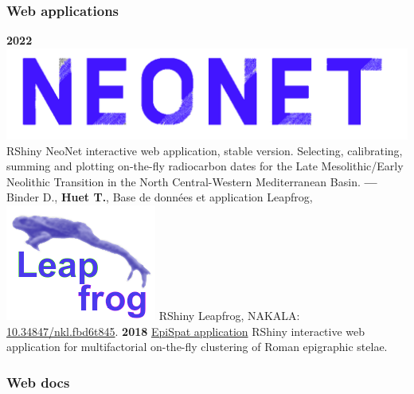 \documentclass{article}
\begin{document}
\subsubsection*{Web applications}

\smallbreak
\textbf{2022 }\href{http://shinyserver.cfs.unipi.it:3838/C14/}{\includegraphics[scale=0.04]{neonet-blue.png}} \textsf{RShiny} NeoNet interactive web application, stable version. Selecting, calibrating, summing and plotting on-the-fly radiocarbon dates for the Late Mesolithic/Early Neolithic Transition in the North Central-Western Mediterranean Basin.
\smallbreak
\textbf{--- } Binder D., \textbf{Huet T.}, Base de données et application Leapfrog, \href{https://devr.cepam.cnrs.fr/shinyapps/leap/}{\includegraphics[scale=0.10]{leapfrog-blue.png}} \textsf{RShiny} Leapfrog, NAKALA: \href{https://nakala.fr/10.34847/nkl.fbd6t845}{10.34847/nkl.fbd6t845}.
\smallbreak
\textbf{2018 }\href{https://epispat.shinyapps.io/analyses_mult_5/}{EpiSpat application} \textsf{RShiny} interactive web application for multifactorial on-the-fly clustering of Roman epigraphic stelae.
\smallbreak

\subsubsection*{Web docs}
\end{document}
